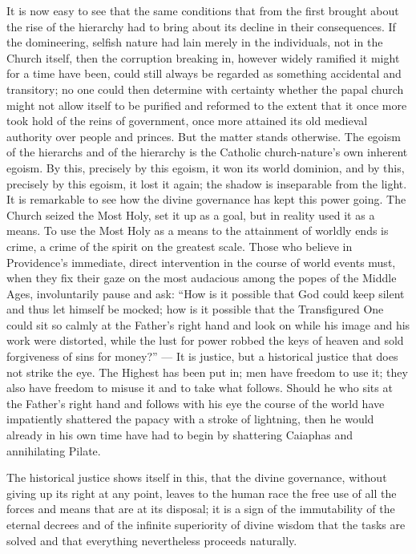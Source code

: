 \documentclass[12pt,a4paper,openany]{book}
\newcommand{\opage}[1]{\marginnote{\footnotesize\textit{[#1]}}}
\begin{document}
It is now easy to see that the same conditions that
from the first brought about the rise of the hierarchy had to bring about
its decline in their consequences. If the domineering, selfish
nature had lain merely in the individuals, not in the Church
itself, then the corruption breaking in, however
widely ramified it might for a time have been, could still
always be regarded as something accidental and transitory;
no one could then determine with certainty whether the papal church
might not allow itself to be purified and reformed to the extent that it
once more took hold of the reins of government, once more attained
its old medieval authority over people and
princes. But the matter stands otherwise. The egoism of the hierarchs
and of the hierarchy is the Catholic church-nature's
own inherent egoism. By this, precisely by this
egoism, it won its world dominion, and by this,
precisely by this egoism, it lost it again; the shadow
is inseparable from the light. It is remarkable to see
how the divine governance has kept this
\setcounter{footnote}{0}%
\opage{300}power going. The Church seized the Most Holy, set it up
as a goal, but in reality used it as a means.
To use the Most Holy as a means to the attainment of
worldly ends is crime, a crime of the spirit on
the greatest scale. Those who believe in Providence's immediate,
direct intervention in the course of
world events must, when they fix their gaze on the most audacious
among the popes of the Middle Ages, involuntarily pause and ask:
``How is it possible that God could keep silent and thus let
himself be mocked; how is it possible that the Transfigured One could
sit so calmly at the Father's right hand and look on while his
image and his work were distorted, while the lust for power
robbed the keys of heaven and sold forgiveness of sins for money?''
--- It is justice, but a historical justice
that does not strike the eye. The Highest has been put in;
men have freedom to use it; they also have
freedom to misuse it and to take what follows.
Should he who sits at the Father's right hand and follows with
his eye the course of the world have impatiently shattered the papacy
with a stroke of lightning, then he would already in his own time
have had to begin by shattering Caiaphas and annihilating Pilate.

The historical justice shows itself in this, that the divine governance,
without giving up its right at any point, leaves
to the human race the free use of all the forces and
means that are at its disposal; it is a sign of
the immutability of the eternal decrees and of the infinite
superiority of divine wisdom that the tasks
are solved and that everything nevertheless proceeds naturally.
\end{document}
